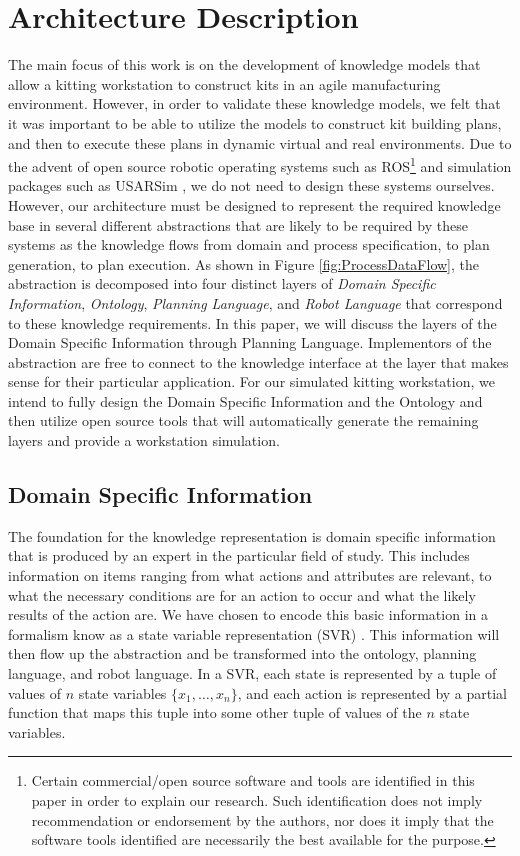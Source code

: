 \section{Architecture Description}
\label{sect:Architecture}
The main focus of this work is on the development of knowledge models that allow a kitting workstation to construct kits
in an agile manufacturing environment. However, in order to validate these knowledge models, we felt that it was
important to be able to utilize the models to construct kit building plans, and then to execute these plans in dynamic
virtual and real environments. Due to the advent of open source robotic operating systems such as ROS\footnote{Certain commercial/open source software and tools are identified in this paper in order to explain our research. Such identification does not imply
recommendation or endorsement by the authors, nor does it imply that the software tools identified are necessarily the best available for the purpose.}\cite{ROS}
 and simulation
packages such as USARSim \cite{Balakirsky2007}, we do not need to design these systems ourselves. However, our architecture must
be designed to represent the required knowledge base in several different abstractions that are likely to be
required by these systems as the knowledge flows from domain and process specification, to plan generation, to plan execution.
As shown in Figure \ref{fig:ProcessDataFlow}, the abstraction is decomposed into four
distinct layers of {\it Domain Specific Information}, {\it Ontology}, {\it Planning Language}, and {\it Robot Language} that correspond to these
knowledge requirements. In this paper, we will discuss the layers of the Domain Specific Information through Planning Language. Implementors of the abstraction are free to connect to the knowledge interface at the layer that makes sense for
their particular application. For our simulated kitting workstation, we intend to fully design the Domain Specific Information and the Ontology and
then utilize open
source tools that will automatically generate the remaining layers and provide a workstation simulation.

\subsection{Domain Specific Information}
\label{subsect:DomainSpecific}
The foundation for the knowledge representation is domain specific information that is produced by an expert in the particular field of study. This includes
information on items ranging from what actions and attributes are relevant, to what the necessary conditions are for an action to occur and what the
likely results of the action are. We have chosen to encode this basic information in a formalism know as a state variable representation (SVR) \cite{NAU.2004}.
This information will then flow up the abstraction and be transformed into the ontology, planning language, and robot language.
In a SVR, each state is represented by a tuple of values of $n$ state variables $\lbrace x_1,\dots,x_n\rbrace$, and each action is represented by a partial function that maps this tuple into some other tuple of values of the $n$ state variables.

